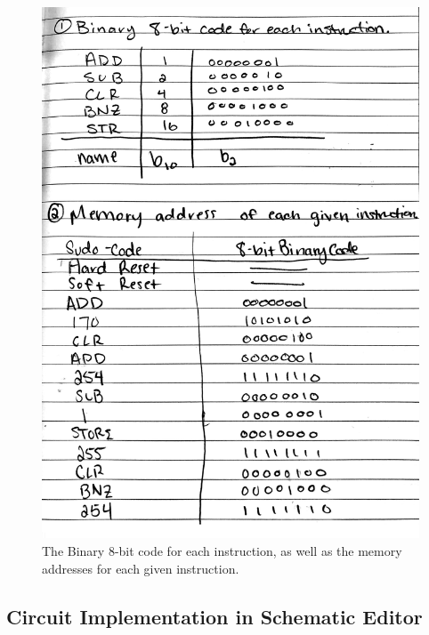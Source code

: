 \documentclass[12pt]{article}
\begin{document}
		\begin{figure}[h]
		\centering
			\includegraphics[scale=.09]{Prelab.jpg}
			\caption{The Binary 8-bit code for each instruction, as well as the memory addresses for each given instruction.}
		\end{figure}

		
\newpage
	\subsection{Circuit Implementation in Schematic Editor}
		\paragraph*{}
			
\end{document}
